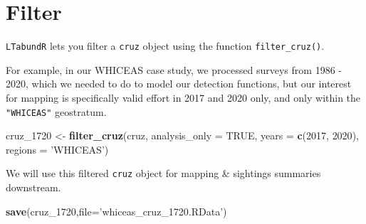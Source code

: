 \documentclass[
]{book}
\newenvironment{Shaded}{\begin{snugshade}}{\end{snugshade}}
\newcommand{\DataTypeTok}[1]{\textcolor[rgb]{0.13,0.29,0.53}{#1}}
\newcommand{\DecValTok}[1]{\textcolor[rgb]{0.00,0.00,0.81}{#1}}
\newcommand{\FloatTok}[1]{\textcolor[rgb]{0.00,0.00,0.81}{#1}}
\newcommand{\KeywordTok}[1]{\textcolor[rgb]{0.13,0.29,0.53}{\textbf{#1}}}
\newcommand{\NormalTok}[1]{#1}
\newcommand{\OperatorTok}[1]{\textcolor[rgb]{0.81,0.36,0.00}{\textbf{#1}}}
\newcommand{\OtherTok}[1]{\textcolor[rgb]{0.56,0.35,0.01}{#1}}
\newcommand{\StringTok}[1]{\textcolor[rgb]{0.31,0.60,0.02}{#1}}
\begin{document}
\begin{Shaded}
\end{Shaded}

\hypertarget{filter-1}{%
\section*{Filter}\label{filter-1}}

\texttt{LTabundR} lets you filter a \texttt{cruz} object using the function \texttt{filter\_cruz()}.

For example, in our WHICEAS case study, we processed surveys from 1986 - 2020, which we needed to do to model our detection functions, but our interest for mapping is specifically valid effort in 2017 and 2020 only, and only within the \texttt{"WHICEAS"} geostratum.

\begin{Shaded}
\begin{Highlighting}[]
\NormalTok{cruz_}\DecValTok{1720}\NormalTok{ <-}\StringTok{ }
\StringTok{  }\KeywordTok{filter_cruz}\NormalTok{(cruz,}
              \DataTypeTok{analysis_only =} \OtherTok{TRUE}\NormalTok{,}
              \DataTypeTok{years =} \KeywordTok{c}\NormalTok{(}\DecValTok{2017}\NormalTok{, }\DecValTok{2020}\NormalTok{),}
              \DataTypeTok{regions =} \StringTok{'WHICEAS'}\NormalTok{)}
\end{Highlighting}
\end{Shaded}

We will use this filtered \texttt{cruz} object for mapping \& sightings summaries downstream.

\begin{Shaded}
\begin{Highlighting}[]
\KeywordTok{save}\NormalTok{(cruz_}\DecValTok{1720}\NormalTok{,}\DataTypeTok{file=}\StringTok{'whiceas_cruz_1720.RData'}\NormalTok{)}
\end{Highlighting}
\end{Shaded}
\end{document}
